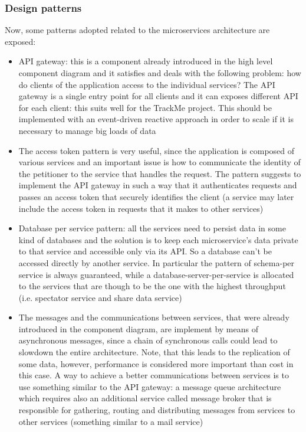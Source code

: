 \subsubsection{Design patterns}
Now, some patterns adopted related to the microservices architecture are exposed:
\begin{itemize}
\item API gateway: this is a component already introduced in the high level component diagram and it
satisfies and deals with the following problem: how do clients of the application access to the individual
services? The API gateway is a single entry point for all clients and it can exposes different API for
each client: this suits well for the TrackMe project. This should be implemented with an event-driven
reactive approach in order to scale if it is necessary to manage big loads of data \\
\item The access token pattern is very useful, since the application is composed of various services and
an important issue is how to communicate the identity of the petitioner to the service that handles the
request. 
The pattern suggests to implement the API gateway in such
a way that it authenticates requests and passes an access token that securely identifies the client (a
service may later include the access token in requests that it makes to other services)
\item Database per service pattern: all the services need to persist data in some kind of databases and
the solution is to keep each microservice's data private to that service and accessible only via its API.
So a database can't be accessed directly by another service. In particular the pattern of schema-per
service is always guaranteed, while a database-server-per-service is allocated to the services that are
though to be the one with the highest throughput (i.e. spectator service and share data service)
\item The messages and the communications between services, that were already introduced in the component diagram, are implement by means of
asynchronous messages, since a chain of synchronous calls could lead to slowdown the entire architecture. Note, that this leads to the
replication of some data, however, performance is considered more important than cost in this case. A way to achieve a better communications between services is to use something similar to the API gateway: a message queue architecture which requires also an additional service called message broker that is responsible for gathering, routing and distributing messages from services to other services (something similar to a mail service)

\end{itemize}
